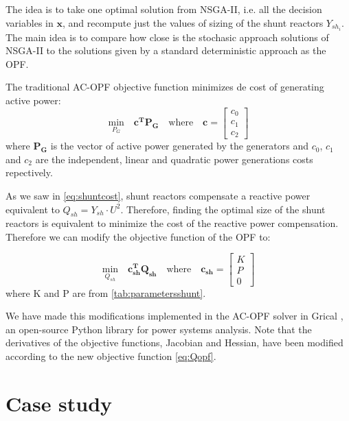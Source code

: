 \documentclass[a4paper,11pt, titlepage, twoside]{article}
\begin{document}
The idea is to take one optimal solution from NSGA-II, i.e. all the decision variables in $\mathbf{x}$, and recompute just the values of sizing of the shunt reactors $Y_{sh_i}$. The main idea is to compare how close is the 
stochasic approach solutions of NSGA-II to the solutions given by a standard deterministic approach as the OPF. \par


The traditional AC-OPF objective function \cite{opfnotes} minimizes de cost of generating active power:
\begin{equation}
    \underset{P_G}{\text{min}} \quad \mathbf{c^T} \mathbf{P_G} \quad \text{where} \quad \mathbf{c} = \begin{bmatrix} c_0 \\ c_1 \\ c_2 \end{bmatrix}
\end{equation}
where $\mathbf{P_G}$ is the vector of active power generated by the generators and $c_0$, $c_1$ and $c_2$ are the independent, linear and quadratic power generations costs repectively.

As we saw in \ref{eq:shuntcost}, shunt reactors compensate a reactive power equivalent to $Q_{sh} = Y_{sh} \cdot U^2$. Therefore, finding the optimal size of the shunt reactors is equivalent
to minimize the cost of the reactive power compensation. Therefore we can modify the objective function of the OPF to:

\begin{equation}\label{eq:Qopf}
\underset{Q_{sh}}{\text{min}} \quad \mathbf{c_{sh}^T} \mathbf{Q_{sh}} \quad \text{where} \quad \mathbf{c_{sh}} = \begin{bmatrix} K \\ P \\ 0 \end{bmatrix}
\end{equation}
where K and P are from \ref{tab:parametersshunt}.\par
We have made this modifications implemented in the AC-OPF solver in Grical \cite{gridcal}, an open-source Python library for power systems analysis. Note that the derivatives of the objective functions, Jacobian and Hessian, have
been modified according to the new objective function \ref{eq:Qopf}.


\section{Case study}\label{CaseStudies}
\end{document}
